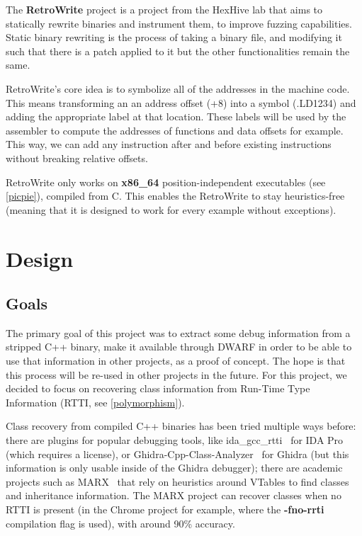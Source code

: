 \documentclass[a4paper,11pt,oneside]{report}
\begin{document}
The \textbf{RetroWrite}\cite{dinesh20oakland} project is a project from the
HexHive lab that aims to statically rewrite binaries and instrument them, to
improve fuzzing capabilities.
Static binary rewriting is the process of taking a binary file, and modifying
it such that there is a patch applied to it but the other functionalities
remain the same.

RetroWrite's core idea is to symbolize all of the addresses in the machine
code. This means transforming an an address offset (+8) into a symbol
(.LD1234) and adding the appropriate label at that location.
These labels will be used by the assembler to compute the addresses of
functions and data offsets for example.
This way, we can add any instruction after and before existing instructions
without breaking relative offsets.

RetroWrite only works on \textbf{x86\_64} position-independent executables
(see \autoref{picpie}), compiled from C. This enables the RetroWrite to stay
heuristics-free (meaning that it is designed to work for every example without
exceptions).


\chapter{Design}



\section{Goals}

The primary goal of this project was to extract some debug information from a
stripped C++ binary, make it available through DWARF in order to be able to
use that information in other projects, as a proof of concept.
The hope is that this process will be re-used in other projects in the future.
For this project, we decided to focus on recovering class information from
Run-Time Type Information (RTTI, see \autoref{polymorphism}).

Class recovery from compiled C++ binaries has been tried multiple ways before:
there are plugins for popular debugging tools, like 
ida\_gcc\_rtti~\cite{idagccrtti} for IDA Pro (which requires a license),
or Ghidra-Cpp-Class-Analyzer~\cite{ghidracppclassanalyzer} for Ghidra
(but this information is only usable inside of the Ghidra debugger);
there are academic projects such as MARX~\cite{marx} that rely on heuristics 
around VTables to find classes and inheritance information.
The MARX project can recover classes when no RTTI is present (in the Chrome 
project for example, where the \textbf{-fno-rrti} compilation flag is used),
with around 90\% accuracy.
\end{document}
